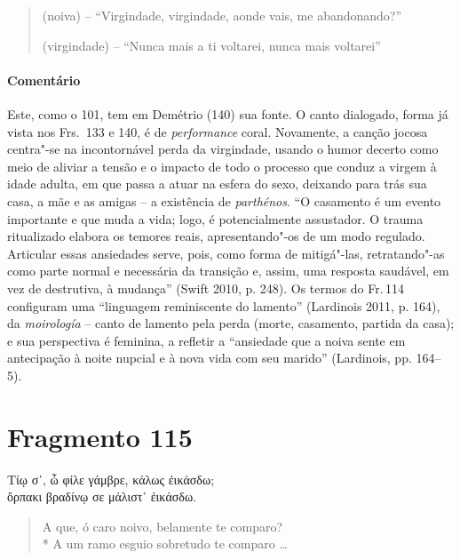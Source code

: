 \begin{verse}
(noiva) -- ``Virgindade, virgindade, aonde vais, me abandonando?''

(virgindade) -- ``Nunca mais a ti voltarei, nunca mais voltarei''
\end{verse}

{\paragraph{Comentário} Este, como o 101, tem em Demétrio (140) sua fonte. O canto dialogado, forma já vista
nos Frs.~133 e 140, é de \textit{performance} coral. Novamente, a canção jocosa
centra"-se na incontornável perda da virgindade, usando o humor decerto como
meio de aliviar a tensão e o impacto de todo o processo que conduz a virgem à
idade adulta, em que passa a atuar na esfera do sexo, deixando para trás sua casa, a mãe e as amigas -- a existência de \textit{parthénos}.
“O casamento é um evento importante e que muda a vida; logo, é potencialmente assustador. O trauma ritualizado elabora os temores reais, apresentando"-os de um modo regulado. Articular essas ansiedades serve, pois, como forma de mitigá"-las, retratando"-as como parte normal e necessária da transição e, assim, uma resposta saudável, em vez de destrutiva, à mudança” (Swift 2010, p. 248).
Os termos do Fr.\,114 configuram uma “linguagem reminiscente do lamento” (Lardinois 2011, p. 164), da \textit{moirología} -- canto de lamento pela perda (morte, casamento, partida da casa); e sua perspectiva é feminina, a refletir a “ansiedade que a noiva sente em antecipação à noite nupcial e à nova vida com seu marido” (Lardinois, pp. 164--5).}



\pagebreak
\section{Fragmento 115}

\begin{gkverse}
Τίῳ σ᾿, ὦ φίλε γάμβρε, κάλως ἐικάσδω;\\
ὄρπακι βραδίνῳ σε μάλιστ᾿ ἐικάσδω.
\end{gkverse}

\begin{verse}
A que, ó caro noivo, belamente te comparo?\\*
A um ramo esguio sobretudo te comparo \ldots{}
\end{verse}

